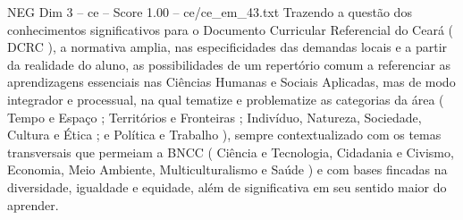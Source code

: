 \begin{textsample}{NEG Dim 3 – ce – Score 1.00 – ce/ce\_em\_43.txt}
Trazendo a questão dos conhecimentos significativos para o Documento Curricular Referencial do Ceará ( DCRC ), a normativa amplia, nas especificidades das demandas locais e a partir da realidade do aluno, as possibilidades de um repertório comum a referenciar as aprendizagens essenciais nas Ciências Humanas e Sociais Aplicadas, mas de modo integrador e processual, na qual tematize e problematize as categorias da área ( Tempo e Espaço ; Territórios e Fronteiras ; Indivíduo, Natureza, Sociedade, Cultura e Ética ; e Política e Trabalho ), sempre contextualizado com os temas transversais que permeiam a BNCC ( Ciência e Tecnologia, Cidadania e Civismo, Economia, Meio Ambiente, Multiculturalismo e Saúde ) e com bases fincadas na diversidade, igualdade e equidade, além de significativa em seu sentido maior do aprender.

\end{textsample}
